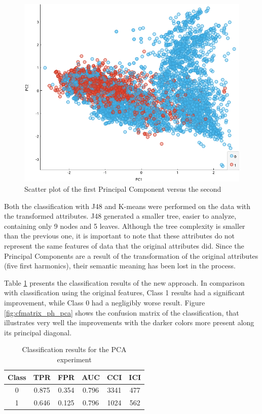 \documentclass{article}
\begin{document}
\begin{figure}[htbp]
    \centering
    \includegraphics[scale=0.5]{pc1vspc2.png}
    \caption{Scatter plot of the first Principal Component versus the second}
    \label{fig:pc1_vs_pc2}
\end{figure}

Both the classification with J48 and K-means were performed on the data with the transformed attributes. J48 generated a smaller tree, easier to analyze, containing only 9 nodes and 5 leaves. Although the tree complexity is smaller than the previous one, it is important to note that these attributes do not represent the same features of data that the original attributes did. Since the Principal Components are a result of the transformation of the original attributes (five first harmonics), their semantic meaning has been lost in the process. 

Table \ref{tab:phoneme_pca} presents the classification results of the new approach. In comparison with classification using the original features, Class 1 results had a significant improvement, while Class 0 had a negligibly worse result. Figure \ref{fig:cfmatrix_ph_pca} shows the confusion matrix of the classification, that illustrates very well the improvements with the darker colors more present along its principal diagonal. 

\begin{table}[htbp]
    \centering
    \begin{tabular}{c|c|c|c|c|c}
         Class &  TPR & FPR & AUC & CCI & ICI \\ \hline
         0 & 0.875 & 0.354 & 0.796 & 3341 & 477 \\
         1 & 0.646 & 0.125 & 0.796 & 1024 & 562 \\
    \end{tabular}
    \caption{Classification results for the PCA experiment}
    \label{tab:phoneme_pca}
\end{table}
\end{document}
